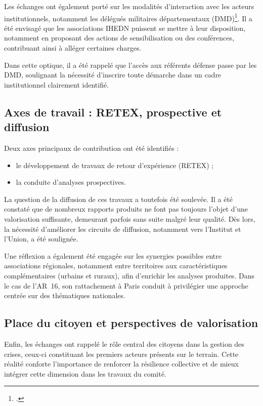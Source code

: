 \documentclass[12pt,a4paper]{article}
\begin{document}
Les échanges ont également porté sur les modalités d'interaction avec les acteurs institutionnels, notamment les délégués militaires départementaux (DMD)\footcite{DMD_def}. Il a été envisagé que les associations IHEDN puissent se mettre à leur disposition, notamment en proposant des actions de sensibilisation ou des conférences, contribuant ainsi à alléger certaines charges.

Dans cette optique, il a été rappelé que l'accès aux référents défense passe par les DMD, soulignant la nécessité d'inscrire toute démarche dans un cadre institutionnel clairement identifié.

\subsection{Axes de travail : RETEX, prospective et diffusion}

Deux axes principaux de contribution ont été identifiés :
\begin{itemize}
    \item le développement de travaux de retour d'expérience (RETEX) ;
    \item la conduite d'analyses prospectives.
\end{itemize}

La question de la diffusion de ces travaux a toutefois été soulevée. Il a été constaté que de nombreux rapports produits ne font pas toujours l'objet d'une valorisation suffisante, demeurant parfois sans suite malgré leur qualité. Dès lors, la nécessité d'améliorer les circuits de diffusion, notamment vers l'Institut et l'Union, a été soulignée.

Une réflexion a également été engagée sur les synergies possibles entre associations régionales, notamment entre territoires aux caractéristiques complémentaires (urbains et ruraux), afin d'enrichir les analyses produites. Dans le cas de l'AR~16, son rattachement à Paris conduit à privilégier une approche centrée sur des thématiques nationales.

\subsection{Place du citoyen et perspectives de valorisation}

Enfin, les échanges ont rappelé le rôle central des citoyens dans la gestion des crises, ceux-ci constituant les premiers acteurs présents sur le terrain. Cette réalité conforte l'importance de renforcer la résilience collective et de mieux intégrer cette dimension dans les travaux du comité.
\end{document}
